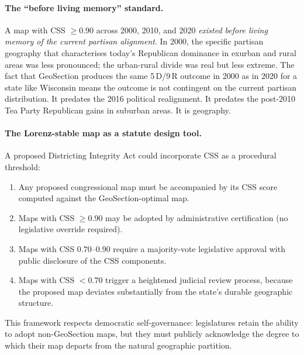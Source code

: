 \paragraph{The ``before living memory'' standard.}
A map with CSS $\geq 0.90$ across 2000, 2010, and 2020 \emph{existed before
living memory of the current partisan alignment}.
In 2000, the specific partisan geography that characterises today's Republican
dominance in exurban and rural areas was less pronounced; the urban-rural
divide was real but less extreme.
The fact that GeoSection produces the same 5\,D/9\,R outcome in 2000 as in
2020 for a state like Wisconsin means the outcome is not contingent on the
current partisan distribution.
It predates the 2016 political realignment.
It predates the post-2010 Tea Party Republican gains in suburban areas.
It is geography.

\paragraph{The Lorenz-stable map as a statute design tool.}
A proposed Districting Integrity Act could incorporate CSS as a procedural
threshold:
\begin{enumerate}
\item Any proposed congressional map must be accompanied by its CSS score
  computed against the GeoSection-optimal map.
\item Maps with CSS $\geq 0.90$ may be adopted by administrative certification
  (no legislative override required).
\item Maps with CSS $0.70$--$0.90$ require a majority-vote legislative approval
  with public disclosure of the CSS components.
\item Maps with CSS $< 0.70$ trigger a heightened judicial review process,
  because the proposed map deviates substantially from the state's durable
  geographic structure.
\end{enumerate}

This framework respects democratic self-governance: legislatures retain the
ability to adopt non-GeoSection maps, but they must publicly acknowledge the
degree to which their map departs from the natural geographic partition.

